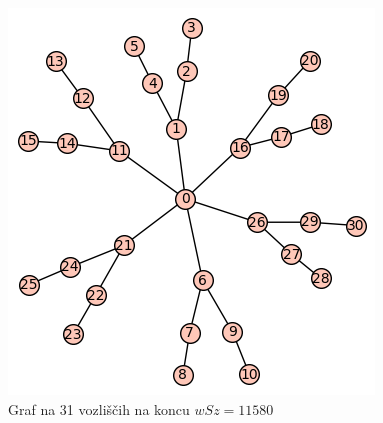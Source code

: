 \documentclass[12pt, a4paper]{article}
\begin{document}
\begin{figure}[h]
\centering
\includegraphics[scale=0.5]{koncni_graf31}
\caption{Graf na 31 vozliščih na koncu $wSz = 11580$}
\end{figure}




\newpage
\end{document}
